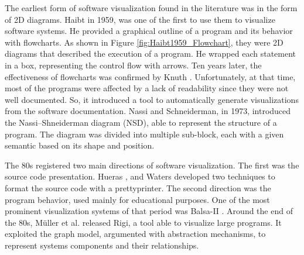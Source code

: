 The earliest form of software visualization found in the literature was in the form of 2D diagrams. 
Haibt \cite{Haibt1959} in 1959, was one of the first to use them to visualize software systems. 
He provided a graphical outline of a program and its behavior with flowcharts. As shown in Figure \ref{fig:Haibt1959_Flowchart}, they 
were 2D diagrams that described the execution of a program. He wrapped each statement in a box, representing the control flow with arrows.
Ten years later, the effectiveness of flowcharts was confirmed by Knuth \cite{Knuth1963}. 
Unfortunately, at that time, most of the programs were affected by a lack of readability since they were not well documented. 
So, it introduced a tool to automatically generate visualizations from the software documentation. 
Nassi and Schneiderman\cite{Nassi1973}, in 1973, introduced the Nassi–Shneiderman diagram (NSD), able to represent the structure of a program. 
The diagram was divided into multiple sub-block, each with a given semantic based on its shape and position. 


The 80s registered two main directions of software visualization. The first was the source code presentation.
Hueras \cite{Hueras1977}, and Waters \cite{Waters1983} developed two techniques to format the source code with a prettyprinter. 
The second direction was the program behavior, used mainly for educational purposes. One of the most prominent visualization systems of that period was Balsa-II \cite{Brown1988}.
Around the end of the 80s, Müller et al. \cite{Mueller1988} released Rigi, a tool able to visualize large programs.
It exploited the graph model, argumented with abstraction mechanisms, to represent systems components and their relationships. 





